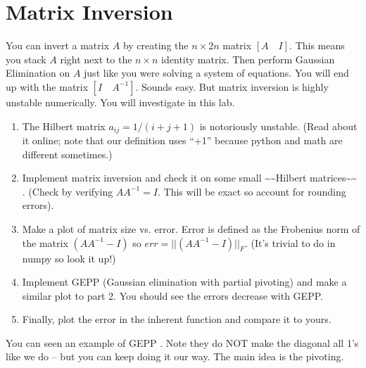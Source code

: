 \documentclass[letterpaper,10pt,english]{jupyterBook}
\begin{document}
\sphinxstepscope


\chapter{Matrix Inversion}
\label{\detokenize{lessons/inversion:matrix-inversion}}\label{\detokenize{lessons/inversion::doc}}
\sphinxAtStartPar
You can invert a matrix \(A\) by creating the \(n \times 2n\) matrix \([A \quad I]\). This means you stack \(A\) right next to the \(n \times n\) identity matrix. Then perform Gaussian Elimination on \(A\) just like you were solving a system of equations. You will end up with the matrix \([I \quad A^{-1}]\). Sounds easy. But matrix inversion is highly unstable numerically. You will investigate in this lab.
\begin{enumerate}
%
\item {} 
\sphinxAtStartPar
The Hilbert matrix \(a_{ij} = 1/(i+j+1)\) is notoriously unstable. (Read about it online; note that our definition uses “+1” because python and math are different sometimes.)

\item {} 
\sphinxAtStartPar
Implement matrix inversion and check it on some small \textasciitilde{}\textasciitilde{}Hilbert matrices\textasciitilde{}\textasciitilde{} . (Check by verifying \(AA^{-1} = I\). This will  be exact so account for rounding errors).

\item {} 
\sphinxAtStartPar
Make a plot of matrix size vs. error. Error is defined as the Frobenius norm of the matrix \((AA^{-1} - I)\) so \(err = || (AA^{-1} - I) ||_F\). (It’s trivial to do in numpy so look it up!)

\item {} 
\sphinxAtStartPar
Implement GEPP (Gaussian elimination with partial pivoting) and make a similar plot to part 2. You should see the errors decrease with GEPP.

\item {} 
\sphinxAtStartPar
Finally, plot the error in the inherent  function and compare it to yours.

\end{enumerate}

\sphinxAtStartPar
You can seen an example of GEPP . Note they do NOT make the diagonal all 1’s like we do – but you can keep doing it our way. The main idea is the pivoting.
\end{document}
